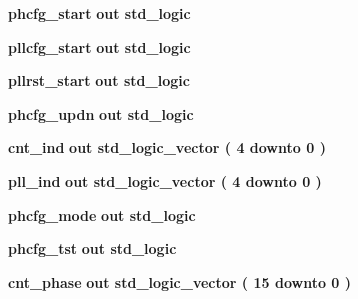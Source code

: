 \begin{DoxyCompactItemize}
\item 
{\bf phcfg\+\_\+start}  {\bfseries {\bfseries \textcolor{keywordflow}{out}\textcolor{vhdlchar}{ }}} {\bfseries \textcolor{comment}{std\+\_\+logic}\textcolor{vhdlchar}{ }} 
\item 
{\bf pllcfg\+\_\+start}  {\bfseries {\bfseries \textcolor{keywordflow}{out}\textcolor{vhdlchar}{ }}} {\bfseries \textcolor{comment}{std\+\_\+logic}\textcolor{vhdlchar}{ }} 
\item 
{\bf pllrst\+\_\+start}  {\bfseries {\bfseries \textcolor{keywordflow}{out}\textcolor{vhdlchar}{ }}} {\bfseries \textcolor{comment}{std\+\_\+logic}\textcolor{vhdlchar}{ }} 
\item 
{\bf phcfg\+\_\+updn}  {\bfseries {\bfseries \textcolor{keywordflow}{out}\textcolor{vhdlchar}{ }}} {\bfseries \textcolor{comment}{std\+\_\+logic}\textcolor{vhdlchar}{ }} 
\item 
{\bf cnt\+\_\+ind}  {\bfseries {\bfseries \textcolor{keywordflow}{out}\textcolor{vhdlchar}{ }}} {\bfseries \textcolor{comment}{std\+\_\+logic\+\_\+vector}\textcolor{vhdlchar}{ }\textcolor{vhdlchar}{(}\textcolor{vhdlchar}{ }\textcolor{vhdlchar}{ } \textcolor{vhdldigit}{4} \textcolor{vhdlchar}{ }\textcolor{keywordflow}{downto}\textcolor{vhdlchar}{ }\textcolor{vhdlchar}{ } \textcolor{vhdldigit}{0} \textcolor{vhdlchar}{ }\textcolor{vhdlchar}{)}\textcolor{vhdlchar}{ }} 
\item 
{\bf pll\+\_\+ind}  {\bfseries {\bfseries \textcolor{keywordflow}{out}\textcolor{vhdlchar}{ }}} {\bfseries \textcolor{comment}{std\+\_\+logic\+\_\+vector}\textcolor{vhdlchar}{ }\textcolor{vhdlchar}{(}\textcolor{vhdlchar}{ }\textcolor{vhdlchar}{ } \textcolor{vhdldigit}{4} \textcolor{vhdlchar}{ }\textcolor{keywordflow}{downto}\textcolor{vhdlchar}{ }\textcolor{vhdlchar}{ } \textcolor{vhdldigit}{0} \textcolor{vhdlchar}{ }\textcolor{vhdlchar}{)}\textcolor{vhdlchar}{ }} 
\item 
{\bf phcfg\+\_\+mode}  {\bfseries {\bfseries \textcolor{keywordflow}{out}\textcolor{vhdlchar}{ }}} {\bfseries \textcolor{comment}{std\+\_\+logic}\textcolor{vhdlchar}{ }} 
\item 
{\bf phcfg\+\_\+tst}  {\bfseries {\bfseries \textcolor{keywordflow}{out}\textcolor{vhdlchar}{ }}} {\bfseries \textcolor{comment}{std\+\_\+logic}\textcolor{vhdlchar}{ }} 
\item 
{\bf cnt\+\_\+phase}  {\bfseries {\bfseries \textcolor{keywordflow}{out}\textcolor{vhdlchar}{ }}} {\bfseries \textcolor{comment}{std\+\_\+logic\+\_\+vector}\textcolor{vhdlchar}{ }\textcolor{vhdlchar}{(}\textcolor{vhdlchar}{ }\textcolor{vhdlchar}{ } \textcolor{vhdldigit}{15} \textcolor{vhdlchar}{ }\textcolor{keywordflow}{downto}\textcolor{vhdlchar}{ }\textcolor{vhdlchar}{ } \textcolor{vhdldigit}{0} \textcolor{vhdlchar}{ }\textcolor{vhdlchar}{)}\textcolor{vhdlchar}{ }} 

\end{DoxyCompactItemize}
